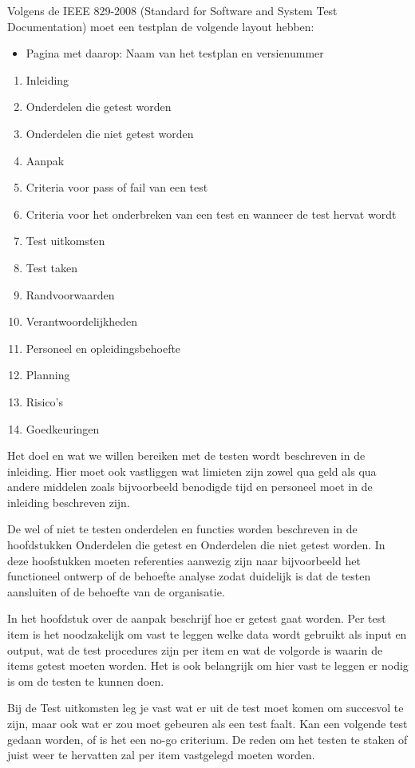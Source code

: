
Volgens de IEEE 829-2008 (Standard for Software and System Test Documentation) moet een testplan de volgende layout hebben:
\begin{itemize}
\item Pagina met daarop: Naam van het testplan en versienummer
\end{itemize}

\begin{enumerate}
\item Inleiding
\item Onderdelen die getest worden
\item Onderdelen die niet getest worden
\item Aanpak
\item Criteria voor pass of fail van een test
\item Criteria voor het onderbreken van een test en wanneer de test hervat wordt
\item Test uitkomsten
\item Test taken
\item Randvoorwaarden
\item Verantwoordelijkheden
\item Personeel en opleidingsbehoefte
\item Planning
\item Risico's
\item Goedkeuringen
\end{enumerate}

Het doel en wat we willen bereiken met de testen wordt beschreven in de inleiding. Hier moet ook vastliggen wat limieten zijn zowel qua geld als qua andere middelen zoals bijvoorbeeld benodigde tijd en personeel moet in de inleiding beschreven zijn.

De wel of niet te testen onderdelen en functies worden beschreven in de hoofdstukken Onderdelen die getest en Onderdelen die niet getest worden. In deze hoofstukken moeten referenties aanwezig zijn naar bijvoorbeeld het functioneel ontwerp of de behoefte analyse zodat duidelijk is dat de testen aansluiten of de behoefte van de organisatie.

In het hoofdstuk over de aanpak beschrijf hoe er getest gaat worden. Per test item is het noodzakelijk om vast te leggen welke data wordt gebruikt als input en output, wat de test procedures zijn per item en wat de volgorde is waarin de items getest moeten worden. Het is ook belangrijk om hier vast te leggen er nodig is om de testen te kunnen doen.

Bij de Test uitkomsten leg je vast wat er uit de test moet komen om succesvol te zijn, maar ook wat er zou moet gebeuren als een test faalt. Kan een volgende test gedaan worden, of is het een no-go criterium. De reden om het testen te staken of juist weer te hervatten zal per item vastgelegd moeten worden.

